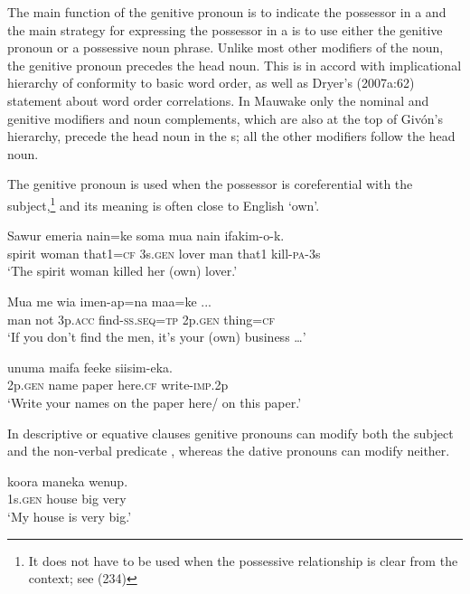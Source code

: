 The main function of the genitive pronoun is to indicate the possessor in a  and the main strategy for expressing the possessor in a  is to use either the genitive pronoun or a possessive noun phrase. Unlike most other modifiers of the noun, the genitive pronoun precedes the head noun. This is in accord with  implicational hierarchy of conformity to basic word order, as well as Dryer's (2007a:62) statement about word order correlations. In Mauwake only the nominal and genitive modifiers and noun complements, which are also at the top of Giv\'on's \citeyear{Givon1984} hierarchy, precede the head noun in the s; all the other modifiers follow the head noun.

The genitive pronoun is used when the possessor is coreferential with the subject,\footnote{It does not have to be used when the possessive relationship is clear from the context; see (234)} and its meaning is often close to English `own'.

\ea%
\label{ex:3:x1805}
\gll Sawur emeria nain=ke  soma mua nain ifakim-o-k. \\
spirit woman that1=\textsc{cf} 3s.\textsc{gen} lover man that1 kill-\textsc{pa}-3s\\
\glt`The spirit woman killed her (own) lover.'
\z

\ea%
\label{ex:3:x1806}
\gll Mua me wia imen-ap=na  maa=ke ... \\
man not 3p.\textsc{acc} find-\textsc{ss}.\textsc{seq}=\textsc{tp} 2p.\textsc{gen} thing=\textsc{cf}\\
\glt`If you don't find the men, it's your (own) business {\dots}'
\z

\ea%
\label{ex:3:x567}
\gll {} unuma maifa feeke siisim-eka. \\
2p.\textsc{gen} name paper here.\textsc{cf} write-\textsc{imp}.2p\\
\glt`Write your names on the paper here/ on this paper.'
\z

In descriptive or equative clauses genitive pronouns can modify both the subject   and the non-verbal predicate  , whereas the dative pronouns can modify neither. 

\ea%
\label{ex:3:x568}
\gll {} koora maneka wenup. \\
1s.\textsc{gen} house big very\\
\glt`My house is very big.'
\z

